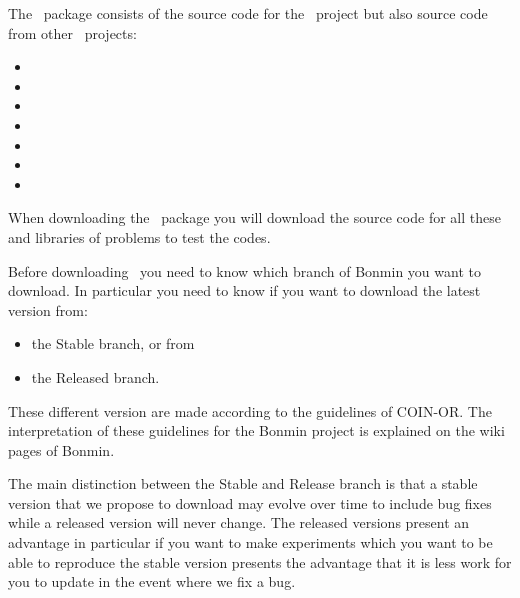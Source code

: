 \begin{PageSummary}
\end{PageSummary}

\begin{quickref}
\end{quickref}




The \Bonmin\ package consists of the source code for the \Bonmin\
project but also source code from other \COINOR\ projects:
\begin{itemize}
\item \BuildTools
\item \Cbc
\item \Cgl
\item \Clp
\item \CoinUtils
\item \Ipopt
\item \Osi
\end{itemize}

When downloading the \Bonmin\ package you will download the source code for all these and
libraries of problems to test the codes.

Before downloading \Bonmin\ you need to know which branch of Bonmin you want to download. 
In particular you need to know if you want to download the latest version from:
\begin{itemize}
    \item the Stable branch, or from
    \item the Released branch. 
\end{itemize}
These different version are made according to the guidelines of COIN-OR. The interpretation of these guidelines for the Bonmin project is explained on the wiki pages of Bonmin.

The main distinction between the Stable and Release branch is that a stable version that we propose to download may evolve over time to include bug fixes while a released version will never change. The released versions present an advantage in particular if you want to make experiments which you want to be able to reproduce the stable version presents the advantage that it is less work for you to update in the event where we fix a bug.

